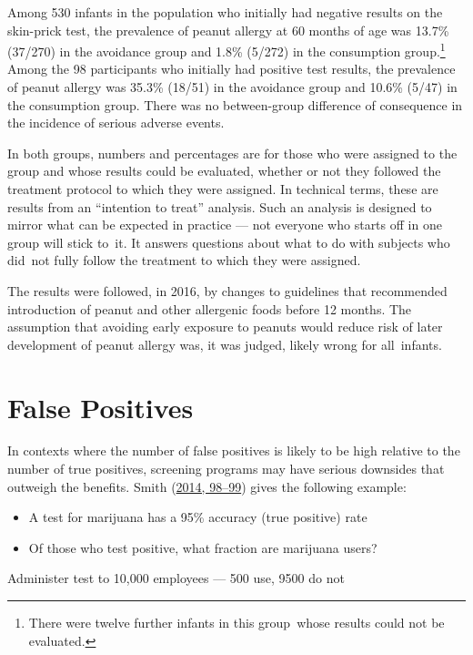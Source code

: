 \documentclass[
  10pt,
  b5paper]{book}
\providecommand{\tightlist}{%
  \setlength{\itemsep}{0pt}\setlength{\parskip}{0pt}}
\begin{document}
Among 530 infants in the population who initially had negative results on the skin-prick test, the prevalence of peanut allergy at 60 months of age was 13.7\% (37/270) in the avoidance group and 1.8\% (5/272) in the consumption group.\footnote{There were twelve further infants in this group~whose results
  could not be evaluated.}
Among the 98 participants who initially had positive test results, the prevalence of peanut allergy was 35.3\% (18/51) in the avoidance group
and 10.6\% (5/47) in the consumption group. There was no
between-group difference of consequence in the incidence of
serious adverse events.

In both groups, numbers and percentages are for those who were assigned
to the group and whose results could be evaluated, whether or not they
followed the treatment protocol to which they were assigned. In technical
terms, these are results from an ``intention to treat'' analysis. Such an
analysis is designed to mirror what can be expected in practice --- not
everyone who starts off in one group will stick to~it. It answers
questions about what to do with subjects who did~not fully follow
the treatment to which they were assigned.

The results were followed, in 2016, by changes to guidelines that
recommended introduction of peanut and other allergenic foods
before 12 months. The assumption that avoiding early exposure to
peanuts would reduce risk of later development of peanut allergy
was, it was judged, likely wrong for all~infants.

\hypertarget{false-positives}{%
\section{False Positives}\label{false-positives}}

In contexts where the number of false positives is likely to be
high relative to the number of true positives, screening
programs may have serious downsides that outweigh the benefits.
Smith (\protect\hyperlink{ref-smith-sd}{2014, 98--99}) gives the following example:

\begin{itemize}
\tightlist
\item
  A test for marijuana has a 95\% accuracy (true positive) rate
\item
  Of those who test positive, what fraction are marijuana users?
\end{itemize}

Administer test to 10,000 employees --- 500 use, 9500 do not
\end{document}
